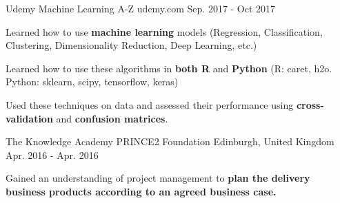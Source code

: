 

\begin{cventries}

  \cventry
  {Udemy}
  {Machine Learning A-Z} %
  {udemy.com} %
  {Sep. 2017 - Oct 2017} %
  {
    \begin{cvitems} %
      \item {Learned how to use \textbf{machine learning} models (Regression, Classification, Clustering, Dimensionality Reduction, Deep Learning, etc.)}
      \item {Learned how to use these algorithms in \textbf{both R} and \textbf{Python} (R: caret, h2o. Python: sklearn, scipy, tensorflow, keras)}
      \item {Used these techniques on data and assessed their performance using \textbf{cross-validation} and \textbf{confusion matrices}.}
    \end{cvitems}
  }

  \cventry
  {The Knowledge Academy} %
  {PRINCE2 Foundation} %
  {Edinburgh, United Kingdom} %
  {Apr. 2016 - Apr. 2016} %
  {
    \begin{cvitems} %
      \item {Gained an understanding of project management to \textbf{plan the delivery business products according to an agreed business case.}}
    \end{cvitems}
  }

\end{cventries}
